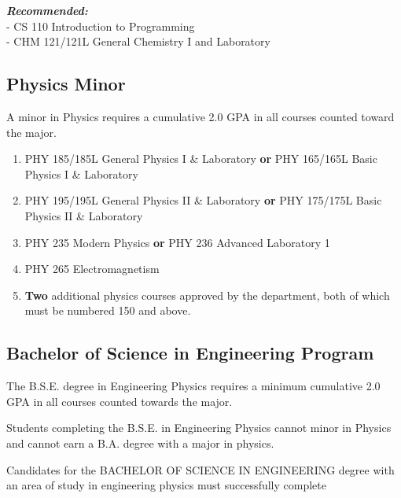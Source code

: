 \documentclass[
  letterpaper,
]{scrbook}
\providecommand{\tightlist}{%
  \setlength{\itemsep}{0pt}\setlength{\parskip}{0pt}}
\begin{document}
\textbf{\emph{Recommended:}}\\
- CS 110 Introduction to Programming\\
- CHM 121/121L General Chemistry I and Laboratory

\subsection{Physics Minor}\label{physics-minor}

A minor in Physics requires a cumulative 2.0 GPA in all courses counted
toward the major.

\begin{enumerate}
\def\labelenumi{\arabic{enumi}.}
\tightlist
\item
  PHY 185/185L General Physics I \& Laboratory \textbf{or} PHY 165/165L
  Basic Physics I \& Laboratory\\
\item
  PHY 195/195L General Physics II \& Laboratory \textbf{or} PHY 175/175L
  Basic Physics II \& Laboratory\\
\item
  PHY 235 Modern Physics \textbf{or} PHY 236 Advanced Laboratory 1\\
\item
  PHY 265 Electromagnetism\\
\item
  \textbf{Two} additional physics courses approved by the department,
  both of which must be numbered 150 and above.
\end{enumerate}

\subsection{Bachelor of Science in Engineering
Program}\label{bachelor-of-science-in-engineering-program}

The B.S.E. degree in Engineering Physics requires a minimum cumulative
2.0 GPA in all courses counted towards the major.

Students completing the B.S.E. in Engineering Physics cannot minor in
Physics and cannot earn a B.A. degree with a major in physics.

Candidates for the BACHELOR OF SCIENCE IN ENGINEERING degree with an
area of study in engineering physics must successfully complete
\end{document}
